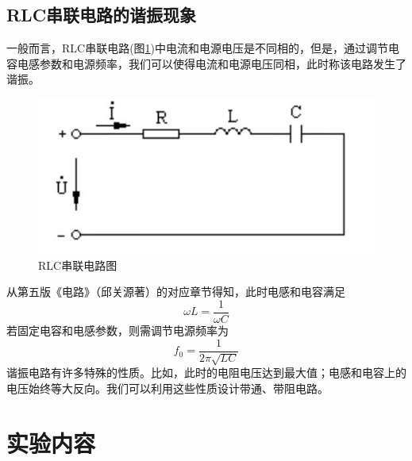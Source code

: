 \documentclass{ctexart}
\begin{document}
\subsection{RLC串联电路的谐振现象}
一般而言，RLC串联电路(图\ref{fig:RLC串联电路图})中电流和电源电压是不同相的，但是，通过调节电容电感参数和电源频率，我们可以使得电流和电源电压同相，此时称该电路发生了谐振。
\begin{figure}[h]
    \centering
    \includegraphics{pic/RLC串联电路图.jpg}
    \caption{RLC串联电路图}
    \label{fig:RLC串联电路图}
\end{figure}
从第五版《电路》（邱关源著）的对应章节得知，此时电感和电容满足
\begin{equation}
    \omega L= \dfrac{1}{\omega C}
\end{equation}
若固定电容和电感参数，则需调节电源频率为
\begin{equation}
    f_0=\dfrac{1}{2 \pi \sqrt{LC}}
\end{equation}
谐振电路有许多特殊的性质。比如，此时的电阻电压达到最大值；电感和电容上的电压始终等大反向。我们可以利用这些性质设计带通、带阻电路。
\section{实验内容}
\end{document}
